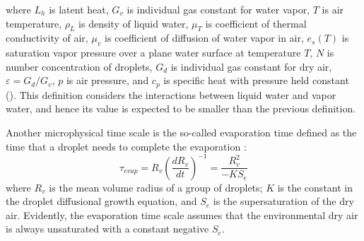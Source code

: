 \documentclass[draft,jgrga]{AGUTeX}
\begin{document}
\begin{article}
where $L_h$ is latent heat, $G_v$ is individual gas constant for water vapor,
$T$ is air temperature, $\rho_L$ is density of liquid water, $\mu_T$ is coefficient
of thermal conductivity of air, $\mu_v$ is coefficient of diffusion of water vapor
in air, $e_s(T)$ is saturation vapor pressure over a plane water surface at
temperature $T$, $N$ is number concentration of droplets, $G_d$ is individual
gas constant for dry air, $\varepsilon = G_d/G_v$, $p$ is air pressure, and
$c_p$ is specific heat with pressure held constant (\cite{Lu2011}).
This definition considers the interactions between liquid water and vapor water, 
and hence its value is expected to be smaller than the previous definition. 

Another microphysical time scale is the so-called evaporation time defined as the time that a droplet needs to complete the evaporation \cite{Andrejczuk2009, Burnet2007Observational}:
\begin{equation}
\tau_{evap} = R_v(\frac{dR_v}{dt})^{-1} = \frac{R_v^2}{-KS_e}
\end{equation}
where $R_v$ is the mean volume radius of a group of droplets; $K$ is the constant in the 
droplet diffusional growth equation, and $S_e$ is the supersaturation of the dry air.
Evidently, the evaporation time scale assumes that the environmental dry air is always 
unsaturated with a constant negative $S_e$.
 

\end{article}
\end{document}
